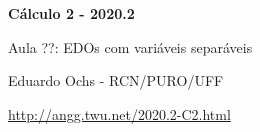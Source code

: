 \documentclass[oneside,12pt]{article}
\begin{document}


\long{}
\long{}
\long{}
\long{}
\long{}
\long{}
\long{}
\long{}
\long{}
\long{}
\long{}

\long{}
\long{}

\def\frown{\ensuremath{{=}{(}}}
\def\True {\mathbf{V}}
\def\False{\mathbf{F}}
\def\D    {\displaystyle}

\def\Rd#1{\ColorRed{#1}}

\def\dydx{\frac{dy}{dx}}
\def\pfo #1{\ensuremath{\mathsf{[#1]}}}
\def\pfot#1{\ensuremath{\textsf{[#1]}}}

\def\drafturl{http://angg.twu.net/LATEX/2020-2-C2.pdf}
\def\drafturl{http://angg.twu.net/2020.2-C2.html}
\def\draftfooter{\tiny \href{\drafturl}{\jobname{}} \ColorBrown{\shorttoday{} \hours}}



%

\thispagestyle{empty}

\begin{center}

\vspace*{1.2cm}

{\bf \Large Cálculo 2 - 2020.2}

\bsk

Aula ??: EDOs com variáveis separáveis

\bsk

Eduardo Ochs - RCN/PURO/UFF

\url{http://angg.twu.net/2020.2-C2.html}

\end{center}
\end{document}
